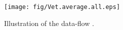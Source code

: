 \begin{figure}[!ht]
\begin{center}
\texttt{[image: fig/Vet.average.all.eps]}
\caption{Illustration of the data-flow \IG.}\label{fig:average}
\end{center}
\end{figure}
